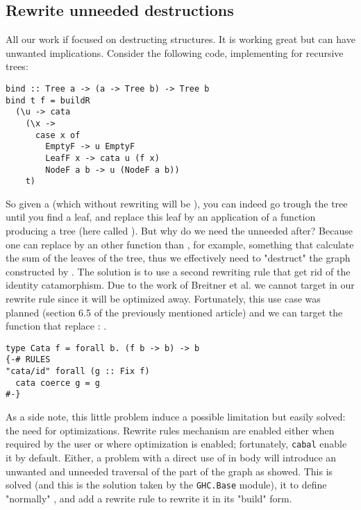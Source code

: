 \subsection{Rewrite unneeded destructions}
\label{sec:bind-def}
All our work if focused on destructing structures. It is working great but can have unwanted implications. Consider the following code, implementing  for recursive trees:

\begin{verbatim}
bind :: Tree a -> (a -> Tree b) -> Tree b
bind t f = buildR
  (\u -> cata
    (\x ->
      case x of
        EmptyF -> u EmptyF
        LeafF x -> cata u (f x)
        NodeF a b -> u (NodeF a b))
    t)
\end{verbatim}

So given a  (which without rewriting will be ), you can indeed go trough the tree until you find a leaf, and replace this leaf by an application of a function producing a tree (here called ). But why do we need the unneeded  after? Because one can replace  by an other function than , for example, something that calculate the sum of the leaves of the tree, thus we effectively need to "destruct" the graph constructed by . The solution is to use a second rewriting rule that get rid of the identity catamorphism. Due to the work of Breitner et al. \cite{Breitner:2014:SZC:2692915.2628141} we cannot target  in our rewrite rule since it will be optimized away. Fortunately, this use case was planned (section 6.5 of the previously mentioned article) and we can target the function that replace : .

\begin{verbatim}
type Cata f = forall b. (f b -> b) -> b
{-# RULES
"cata/id" forall (g :: Fix f)
  cata coerce g = g
#-}
\end{verbatim}

As a side note, this little problem induce a possible limitation but easily solved: the need for optimizations. Rewrite rules mechanism are enabled either when required by the user or where optimization is enabled; fortunately, \verb|cabal| enable it by default. Either, a problem with a direct use of  in  body will introduce an unwanted and unneeded traversal of the part of the graph as showed. This is solved (and this is the solution taken by the \verb|GHC.Base| module), it to define "normally" , and add a rewrite rule to rewrite it in its "build" form.

